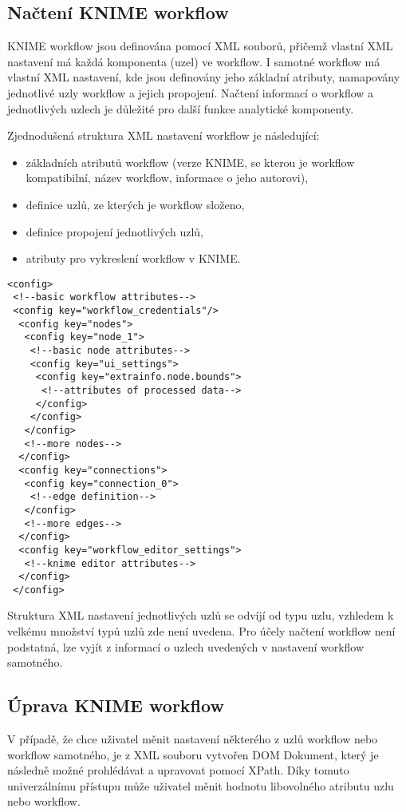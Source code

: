 \documentclass[11pt,twoside,a4paper]{book}
\begin{document}
		\subsection{Načtení KNIME workflow}
		KNIME workflow jsou definována pomocí XML souborů, přičemž vlastní XML nastavení má každá komponenta (uzel) ve workflow. I samotné workflow má vlastní XML nastavení, kde jsou definovány jeho základní atributy, namapovány jednotlivé uzly workflow a jejich propojení. Načtení informací o workflow a jednotlivých uzlech je důležité pro další funkce analytické komponenty.

		Zjednodušená struktura XML nastavení workflow je následující: 

\begin{itemize}
\item základních atributů workflow (verze KNIME, se kterou je workflow kompatibilní, název workflow, informace o jeho autorovi), 
\item definice uzlů, ze kterých je workflow složeno,
\item definice propojení jednotlivých uzlů,
\item atributy pro vykreslení workflow v KNIME.
\end{itemize}

\lstset{language=XML}
\begin{lstlisting}
<config>
 <!--basic workflow attributes-->
 <config key="workflow_credentials"/>
  <config key="nodes">
   <config key="node_1">
    <!--basic node attributes-->
    <config key="ui_settings">
     <config key="extrainfo.node.bounds">
      <!--attributes of processed data-->
     </config>
    </config>
   </config>
   <!--more nodes-->
  </config>
  <config key="connections">
   <config key="connection_0">
    <!--edge definition-->
   </config>
   <!--more edges-->
  </config>
  <config key="workflow_editor_settings">
   <!--knime editor attributes-->
  </config>
 </config>
\end{lstlisting}

		Struktura XML nastavení jednotlivých uzlů se odvíjí od typu uzlu, vzhledem k velkému množství typů uzlů zde není uvedena. Pro účely načtení workflow není podstatná, lze vyjít z informací o uzlech uvedených v nastavení workflow samotného.
		
		\subsection{Úprava KNIME workflow} \label{sec:knimeEdit}
		V případě, že chce uživatel měnit nastavení některého z uzlů workflow nebo workflow samotného, je z XML souboru vytvořen DOM Dokument, který je následně možné prohlédávat a upravovat pomocí XPath. Díky tomuto univerzálnímu přístupu může uživatel měnit hodnotu libovolného atributu uzlu nebo workflow. 
\end{document}
